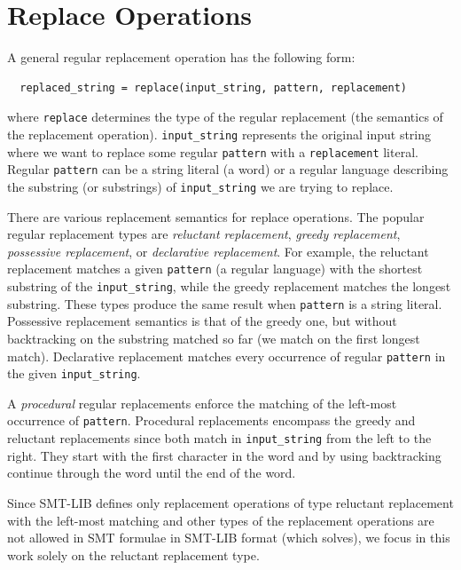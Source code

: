 \section{Replace Operations}
A general regular replacement operation has the following form:
\begin{center}
\begin{verbatim}
  replaced_string = replace(input_string, pattern, replacement)
\end{verbatim}
\end{center}
where \texttt{replace} determines the type of the regular replacement (the semantics of the replacement operation).
\texttt{input\_string} represents the original input string where we want to replace some regular \texttt{pattern} with a \texttt{replacement} literal.
Regular \texttt{pattern} can be a string literal (a word) or a regular language describing the substring (or substrings) of \texttt{input\_string} we are trying to replace.

There are various replacement semantics for replace operations. The popular regular replacement types are \emph{reluctant replacement}, \emph{greedy replacement}, \emph{possessive replacement}, or \emph{declarative replacement}.
For example, the reluctant replacement matches a given \texttt{pattern} (a regular language) with the shortest substring of the \texttt{input\_string}, while the greedy replacement matches the longest substring. These types produce the same result when \texttt{pattern} is a string literal.
Possessive replacement semantics is that of the greedy one, but without backtracking on the substring matched so far (we match on the first longest match).
Declarative replacement matches every occurrence of regular \texttt{pattern} in the given \texttt{input\_string}.

A \emph{procedural} regular replacements enforce the matching of the left-most occurrence of \texttt{pattern}.
Procedural replacements encompass the greedy and reluctant replacements since both match in \texttt{input\_string} from the left to the right.
They start with the first character in the word and by using backtracking continue through the word until the end of the word.

Since SMT-LIB defines only replacement operations of type reluctant replacement with the left-most matching and other types of the replacement operations are not allowed in SMT formulae in SMT-LIB format (which \noodler solves), we focus in this work solely on the reluctant replacement type.

